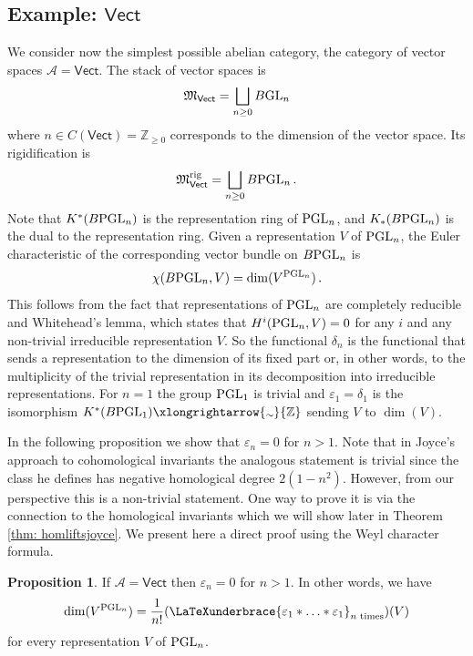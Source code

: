 \documentclass[12pt]{amsart}
\let\underbrace\LaTeXunderbrace
\theoremstyle{definition}
\newtheorem{proposition}[definition]{Proposition}
\newcommand{\BZ}{{\mathbb{Z}}}
\newcommand{\CA}{{\mathcal A}}
\newcommand{\1}{\mathbf 1}
\newcommand{\FM}{{\mathfrak{M}}}
\newcommand{\GL}{{\rm GL}}
\newcommand{\PGL}{{\rm PGL}}
\newcommand{\rig}{\mathrm{rig}}
\newcommand{\isoto}{\xlongrightarrow{\raisebox{-0.3ex}[0pt][0pt]{\(\scriptstyle\sim\)}}}
\begin{document}
\subsection{Example: $\mathsf{Vect}$}\label{subsec: exampleVect} We consider now the simplest possible abelian category, the category of vector spaces $\CA=\mathsf{Vect}$. The stack of vector spaces is
\[\FM_\mathsf{Vect}=\bigsqcup_{n\geq 0} B\GL_n\]
where $n\in C(\mathsf{Vect})=\BZ_{\geq 0}$ corresponds to the dimension of the vector space. Its rigidification is
\[\FM_\mathsf{Vect}^\rig=\bigsqcup_{n\geq 0} B\PGL_n\,.\]
Note that $K^\ast(B\PGL_n)$ is the representation ring of $\PGL_n$, and $K_\ast(B\PGL_n)$ is the dual to the representation ring. Given a representation $V$ of $\PGL_n$, the Euler characteristic of the corresponding vector bundle on $B\PGL_n$ is 
\[\chi(B\PGL_n, V)=\dim(V^{\PGL_n})\,.\]
This follows from the fact that representations of $\PGL_n$ are completely reducible and Whitehead's lemma, which states that $H^i(\PGL_n, V)=0$ for any $i$ and any non-trivial irreducible representation $V$. So the functional $\delta_n$ is the functional that sends a representation to the dimension of its fixed part or, in other words, to the multiplicity of the trivial representation in its decomposition into irreducible representations. For $n=1$ the group $\PGL_1$ is trivial and $\varepsilon_1=\delta_1$ is the isomorphism $K^\ast(B\PGL_1)\isoto \BZ$ sending $V$ to $\dim(V)$.

In the following proposition we show that $\varepsilon_n=0$ for $n>1$. Note that in Joyce's \cite{joyce} approach to cohomological invariants the analogous statement is trivial since the class he defines has negative homological degree $2(1-n^2)$. However, from our perspective this is a non-trivial statement. One way to prove it is via the connection to the homological invariants which we will show later in Theorem \ref{thm: homliftsjoyce}. We present here a direct proof using the Weyl character formula. 

\begin{proposition}\label{prop: epsilonVect}
    If $\CA=\mathsf{Vect}$ then $\varepsilon_n=0$ for $n>1$. In other words, we have
    \[\dim(V^{\PGL_n})=\frac{1}{n!}(\underbrace{\varepsilon_1\ast\ldots \ast\varepsilon_1}_{ n\textup{ times}})(V)\]
    for every representation $V$ of $\PGL_n$.
\end{proposition}
\end{document}
